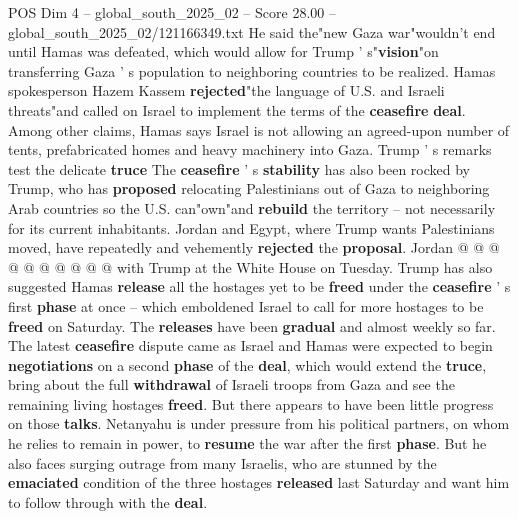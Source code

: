 \begin{textsample}{POS Dim 4 – global\_south\_2025\_02 – Score 28.00 – global\_south\_2025\_02/121166349.txt}
He said the"new Gaza war"wouldn't end until Hamas was defeated, which would allow for Trump ' s"\textbf{vision}"on transferring Gaza ' s population to neighboring countries to be realized.
Hamas spokesperson Hazem Kassem \textbf{rejected}"the language of U.S. and Israeli threats"and called on Israel to implement the terms of the \textbf{ceasefire} \textbf{deal}.
Among other claims, Hamas says Israel is not allowing an agreed-upon number of tents, prefabricated homes and heavy machinery into Gaza.
Trump ' s remarks test the delicate \textbf{truce} The \textbf{ceasefire} ' s \textbf{stability} has also been rocked by Trump, who has \textbf{proposed} relocating Palestinians out of Gaza to neighboring Arab countries so the U.S. can"own"and \textbf{rebuild} the territory -- not necessarily for its current inhabitants.
Jordan and Egypt, where Trump wants Palestinians moved, have repeatedly and vehemently \textbf{rejected} the \textbf{proposal}.
Jordan @ @ @ @ @ @ @ @ @ @ with Trump at the White House on Tuesday.
Trump has also suggested Hamas \textbf{release} all the hostages yet to be \textbf{freed} under the \textbf{ceasefire} ' s first \textbf{phase} at once -- which emboldened Israel to call for more hostages to be \textbf{freed} on Saturday.
The \textbf{releases} have been \textbf{gradual} and almost weekly so far.
The latest \textbf{ceasefire} dispute came as Israel and Hamas were expected to begin \textbf{negotiations} on a second \textbf{phase} of the \textbf{deal}, which would extend the \textbf{truce}, bring about the full \textbf{withdrawal} of Israeli troops from Gaza and see the remaining living hostages \textbf{freed}.
But there appears to have been little progress on those \textbf{talks}.
Netanyahu is under pressure from his political partners, on whom he relies to remain in power, to \textbf{resume} the war after the first \textbf{phase}.
But he also faces surging outrage from many Israelis, who are stunned by the \textbf{emaciated} condition of the three hostages \textbf{released} last Saturday and want him to follow through with the \textbf{deal}.

\end{textsample}
